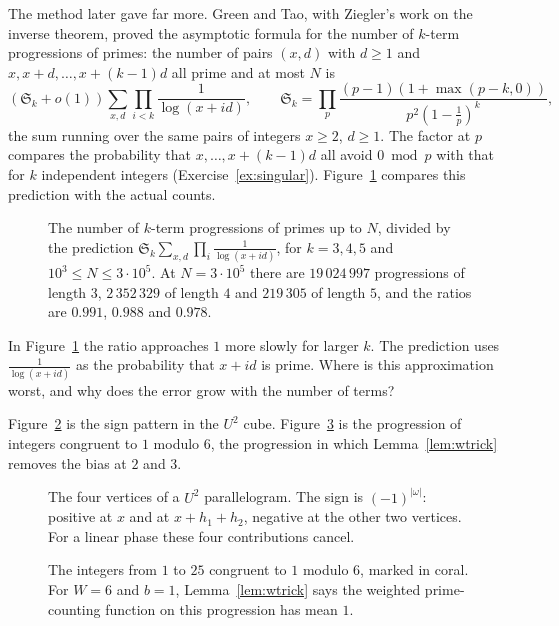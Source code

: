 The method later gave far more. Green and Tao, with Ziegler's work on the inverse theorem, proved the asymptotic formula for the number of $k$-term progressions of primes: the number of pairs $(x,d)$ with $d\ge1$ and $x,x+d,\dots,x+(k-1)d$ all prime and at most $N$ is
\[
(\mathfrak S_k+o(1))\sum_{x,d}\prod_{i<k}\frac1{\log(x+id)},\qquad\mathfrak S_k=\prod_p\frac{(p-1)(1+\max(p-k,0))}{p^2(1-\frac1p)^k},
\]
the sum running over the same pairs of integers $x\ge2$, $d\ge1$. The factor at $p$ compares the probability that $x,\dots,x+(k-1)d$ all avoid $0\bmod p$ with that for $k$ independent integers (Exercise~\ref{ex:singular}). Figure~\ref{fig:primeaps} compares this prediction with the actual counts.

\begin{figure}[ht]
\centering
{}
\caption{The number of $k$-term progressions of primes up to $N$, divided by the prediction $\mathfrak S_k\sum_{x,d}\prod_i\frac1{\log(x+id)}$, for $k=3,4,5$ and $10^3\le N\le3\cdot10^5$. At $N=3\cdot10^5$ there are $19\,024\,997$ progressions of length $3$, $2\,352\,329$ of length $4$ and $219\,305$ of length $5$, and the ratios are $0.991$, $0.988$ and $0.978$.}
\label{fig:primeaps}
\end{figure}

\begin{think}
In Figure~\ref{fig:primeaps} the ratio approaches $1$ more slowly for larger $k$. The prediction uses $\frac1{\log(x+id)}$ as the probability that $x+id$ is prime. Where is this approximation worst, and why does the error grow with the number of terms?
\end{think}

Figure~\ref{fig:v14-extra-13-a} is the sign pattern in the $U^2$ cube. Figure~\ref{fig:v14-extra-13-b} is the progression of integers congruent to $1$ modulo $6$, the progression in which Lemma~\ref{lem:wtrick} removes the bias at $2$ and $3$.

\begin{figure}[ht]
\centering
{}
\caption{The four vertices of a $U^2$ parallelogram. The sign is $(-1)^{|\omega|}$: positive at $x$ and at $x+h_1+h_2$, negative at the other two vertices. For a linear phase these four contributions cancel.}
\label{fig:v14-extra-13-a}
\end{figure}

\begin{figure}[ht]
\centering
{}
\caption{The integers from $1$ to $25$ congruent to $1$ modulo $6$, marked in coral. For $W=6$ and $b=1$, Lemma~\ref{lem:wtrick} says the weighted prime-counting function on this progression has mean $1$.}
\label{fig:v14-extra-13-b}
\end{figure}

